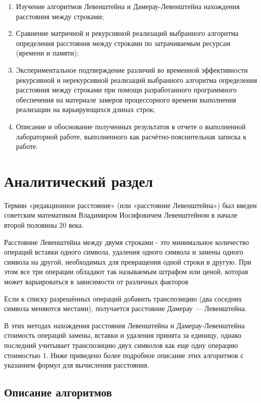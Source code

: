 \documentclass{article}
\begin{document}
\begin{enumerate}
	\item {Изучение алгоритмов Левенштейна и Дамерау-Левенштейна нахождения расстояния между строками;}
	\item {Сравнение матричной и рекурсивной реализаций выбранного алгоритма определения расстояния между строками по затрачиваемым ресурсам (времени и памяти)};
	\item {Экспериментальное подтверждение различий во временной эффективности рекурсивной и нерекурсивной реализаций выбранного алгоритма определения расстояния между строками при помощи разработанного программного обеспечения на материале замеров процессорного времени выполнения реализации на варьирующихся длинах строк;}
	\item {Описание и обоснование полученных результатов в отчете о выполненной лабораторной работе, выполненного как расчётно-пояснительная записка к работе.}
\end{enumerate}

\newpage
\section{Аналитический раздел}
\label{sec:analitics}

Термин «редакционное расстояние» (или «расстояние Левенштейна») был введен советским математиком Владимиром Иосифовичем Левенштейном в начале второй половины 20 века.

Расстояние Левенштейна между двумя строками - это минимальное количество операций вставки одного символа, удаления одного символа и замены одного символа на другой, необходимых для превращения одной строки в другую. При этом все три операции обладают так называемым штрафом или ценой, которая может варьироваться в зависимости от различных факторов

Если к списку разрешённых операций добавить транспозицию (два соседних символа меняются местами), получается расстояние Дамерау — Левенштейна.

В этих методах нахождения расстояния Левенштейна и Дамерау-Левенштейна стоимость операций замены, вставки и удаления принята за единицу, однако последний учитывает транспозицию двух символов как еще одну операцию стоимостью 1. Ниже приведено более подробное описание этих алгоритмов с указанием формул для вычисления расстояния.

\subsection{Описание алгоритмов}
\label{sec:analitics:alg}
\end{document}
